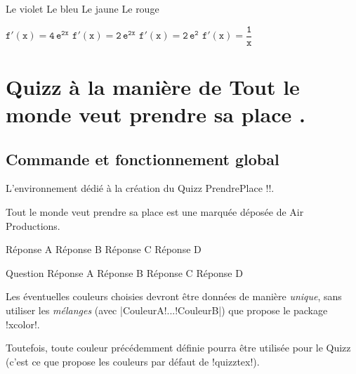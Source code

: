 \documentclass[french,a4paper,11pt]{article}
\begin{document}
\begin{DemoCode}[]
	{Le violet} {Le bleu}
	{Le jaune} {Le rouge}
\end{DemoCode}

\begin{DemoCode}[]
	{$\mathtt{f'(x)=4\,\text{e}^{2x}}$}
	{$\mathtt{f'(x)=2\,\text{e}^{2x}}$}
	{$\mathtt{f'(x)=2\,\text{e}^{2}}$}
	{$\mathtt{f'(x)=\dfrac{1}{x}}$}
\end{DemoCode}

\pagebreak

\section{Quizz à la manière de \og Tout le monde veut prendre sa place \fg.}

\subsection{Commande et fonctionnement global}

\begin{cautionblock}
L'environnement dédié à la création du Quizz \og PrendrePlace \fg{} \motcletex!\QuizzPrendrePlace!.

\smallskip

\textsf{Tout le monde veut prendre sa place\texttrademark} est une marquée déposée de Air Productions.
\end{cautionblock}

\begin{DemoCode}
	{Réponse A}
	{Réponse B}
	{Réponse C}
	{Réponse D}
\end{DemoCode}

\begin{DemoCode}
\QuizzPrendrePlace
	{Question}
	{Réponse A}
	{Réponse B}
	{Réponse C}
	{Réponse D}
\end{DemoCode}

\begin{tipblock}
Les éventuelles couleurs choisies devront être données de manière \textit{unique}, sans utiliser les \textit{mélanges} (avec \motcletex|CouleurA!...!CouleurB|) que propose le package \packagetex!xcolor!.

Toutefois, toute couleur précédemment définie pourra être utilisée pour le Quizz (c'est ce que propose les couleurs par défaut de \packagetex!quizztex!).
\end{tipblock}
\end{document}
